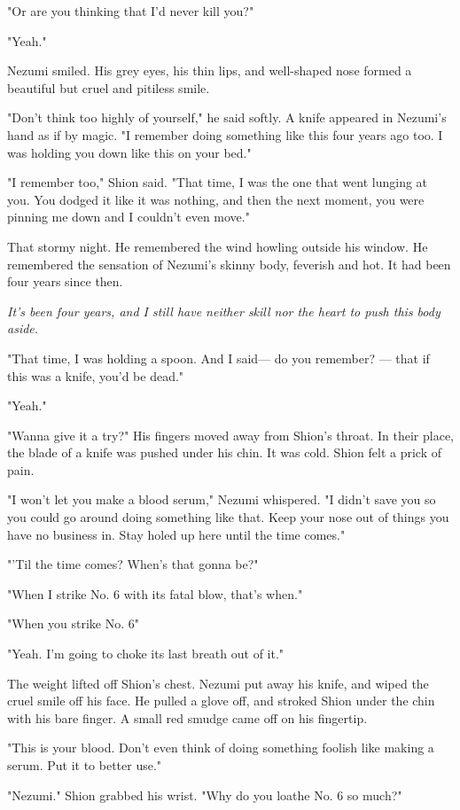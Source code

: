 "Or are you thinking that I'd never kill you?"

"Yeah."

Nezumi smiled. His grey eyes, his thin lips, and well-shaped nose formed
a beautiful but cruel and pitiless smile.

"Don't think too highly of yourself," he said softly. A knife appeared
in Nezumi's hand as if by magic. "I remember doing something like this
four years ago too. I was holding you down like this on your bed."

"I remember too," Shion said. "That time, I was the one that went
lunging at you. You dodged it like it was nothing, and then the next
moment, you were pinning me down and I couldn't even move."

That stormy night. He remembered the wind howling outside his window. He
remembered the sensation of Nezumi's skinny body, feverish and hot. It
had been four years since then.

\emph{It's been four years, and I still have neither skill nor the heart to
push this body aside.}

"That time, I was holding a spoon. And I said--- do you remember? --- that
if this was a knife, you'd be dead."

"Yeah."

"Wanna give it a try?" His fingers moved away from Shion's throat. In
their place, the blade of a knife was pushed under his chin. It was
cold. Shion felt a prick of pain.

"I won't let you make a blood serum," Nezumi whispered. "I didn't save
you so you could go around doing something like that. Keep your nose out
of things you have no business in. Stay holed up here until the time
comes."

"'Til the time comes? When's that gonna be?"

"When I strike No. 6 with its fatal blow, that's when."

"When you strike No. 6\el "

"Yeah. I'm going to choke its last breath out of it."

The weight lifted off Shion's chest. Nezumi put away his knife, and
wiped the cruel smile off his face. He pulled a glove off, and stroked
Shion under the chin with his bare finger. A small red smudge came off
on his fingertip.

"This is your blood. Don't even think of doing something foolish like
making a serum. Put it to better use."

"Nezumi." Shion grabbed his wrist. "Why do you loathe No. 6 so much?"

